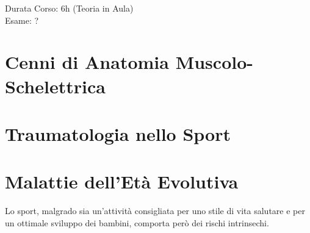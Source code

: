 \documentclass[../uefaC.tex]{subfiles}
\begin{document}

Durata Corso: 6h (Teoria in Aula) \hfill \\
Esame: ?

\section{Cenni di Anatomia Muscolo-Schelettrica}

\section{Traumatologia nello Sport}

\section{Malattie dell'Età Evolutiva}

Lo sport, malgrado sia un'attività consigliata per uno stile di vita salutare e per un ottimale sviluppo dei bambini, comporta però dei rischi intrinsechi.
\end{document}
